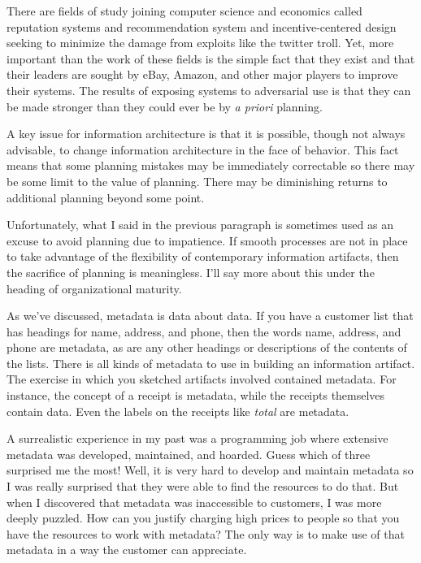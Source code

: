 There are fields of study joining computer science and economics called
reputation systems and recommendation system and incentive-centered
design seeking to minimize the damage from exploits like the twitter
troll. Yet, more important than the work of these fields is the simple
fact that they exist and that their leaders are sought by eBay, Amazon,
and other major players to improve their systems. The results of
exposing systems to adversarial use is that they can be made stronger
than they could ever be by \emph{a priori} planning.

A key issue for information architecture is that it is possible, though
not always advisable, to change information architecture in the face of
behavior. This fact means that some planning mistakes may be immediately
correctable so there may be some limit to the value of planning. There
may be diminishing returns to additional planning beyond some point.

Unfortunately, what I said in the previous paragraph is sometimes used
as an excuse to avoid planning due to impatience. If smooth processes
are not in place to take advantage of the flexibility of contemporary
information artifacts, then the sacrifice of planning is meaningless.
I'll say more about this under the heading of organizational maturity.

\hypertarget{metadata}{%
\label{metadata}}

As we've discussed, metadata is data about data. If you have a customer
list that has headings for name, address, and phone, then the words
name, address, and phone are metadata, as are any other headings or
descriptions of the contents of the lists. There is all kinds of
metadata to use in building an information artifact. The exercise in
which you sketched artifacts involved contained metadata. For instance,
the concept of a receipt is metadata, while the receipts themselves
contain data. Even the labels on the receipts like \emph{total} are
metadata.

A surrealistic experience in my past was a programming job where
extensive metadata was developed, maintained, and hoarded. Guess which
of three surprised me the most! Well, it is very hard to develop and
maintain metadata so I was really surprised that they were able to find
the resources to do that. But when I discovered that metadata was
inaccessible to customers, I was more deeply puzzled. How can you
justify charging high prices to people so that you have the resources to
work with metadata? The only way is to make use of that metadata in a
way the customer can appreciate.

